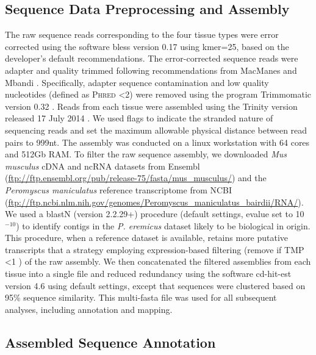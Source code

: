 \documentclass[11pt]{article}
\begin{document}
\subsection*{Sequence Data Preprocessing and Assembly}

The raw sequence reads corresponding to the four tissue types were error corrected using the software bless version 0.17 \cite{Heo:2014cb} using kmer=25, based on the developer's default recommendations. The error-corrected sequence reads were adapter and quality trimmed following recommendations from MacManes \cite{MacManes:2014io} and Mbandi \cite{Christoffels:2014bg}. Specifically, adapter sequence contamination and low quality nucleotides (defined as \textsc{Phred} \textless 2) were removed using the program Trimmomatic version 0.32  \cite{Lohse:2012fg}. Reads from each tissue were assembled using the Trinity version released 17 July 2014 \cite{Haas:2013jq}. We used flags to indicate the stranded nature of sequencing reads and set the maximum allowable physical distance between read pairs to 999nt. The assembly was conducted on a linux workstation with 64 cores and 512Gb RAM. To filter the raw sequence assembly, we downloaded \textit{Mus musculus} cDNA and ncRNA datasets from Ensembl (\url{ftp://ftp.ensembl.org/pub/release-75/fasta/mus_musculus/}) and the \textit{Peromyscus maniculatus} reference transcriptome from NCBI (\url{ftp://ftp.ncbi.nlm.nih.gov/genomes/Peromyscus_maniculatus_bairdii/RNA/}). We used a blastN (version 2.2.29+) procedure (default settings, evalue set to 10$^{-10}$) to identify contigs in the \textit{P. eremicus} dataset likely to be biological in origin. This procedure, when a reference dataset is available, retains more putative transcripts that a strategy employing expression-based filtering (remove if TMP \textless 1  \cite{MacManes:2012bu}) of the raw assembly. We then concatenated the filtered assemblies from each tissue into a single file and reduced redundancy using the software cd-hit-est version 4.6 \cite{Li:2006hr} using default settings, except that sequences were clustered based on 95\% sequence similarity. This multi-fasta file was used for all subsequent analyses, including annotation and mapping. \\

\subsection*{Assembled Sequence Annotation}
\end{document}
